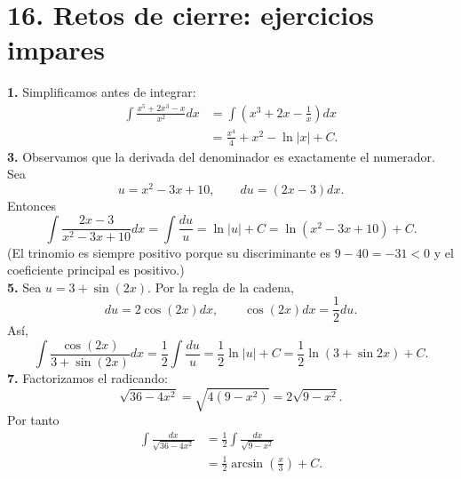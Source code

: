 \documentclass[11pt]{article}
\begin{document}
\section*{16. Retos de cierre: ejercicios impares}
\textbf{1.} Simplificamos antes de integrar:
\begin{align*}\int\frac{x^5+2x^3-x}{x^2}dx&=\int\left(x^3+2x-\frac1x\right)dx\\&=\frac{x^4}{4}+x^2-\ln|x|+C.\end{align*}
\textbf{3.} Observamos que la derivada del denominador es exactamente el numerador. Sea
\[u=x^2-3x+10,\qquad du=(2x-3)dx.\]
Entonces
\[\int\frac{2x-3}{x^2-3x+10}dx=\int\frac{du}{u}=\ln|u|+C=\ln(x^2-3x+10)+C.\]
(El trinomio es siempre positivo porque su discriminante es $9-40=-31<0$ y el coeficiente principal es positivo.)\\
\textbf{5.} Sea $u=3+\sin(2x)$. Por la regla de la cadena,
\[du=2\cos(2x)dx,\qquad \cos(2x)dx=\frac12du.\]
Así,
\[\int\frac{\cos(2x)}{3+\sin(2x)}dx=\frac12\int\frac{du}{u}=\frac12\ln|u|+C=\frac12\ln(3+\sin2x)+C.\]
\textbf{7.} Factorizamos el radicando:
\[\sqrt{36-4x^2}=\sqrt{4(9-x^2)}=2\sqrt{9-x^2}.\]
Por tanto
\begin{align*}\int\frac{dx}{\sqrt{36-4x^2}}&=\frac12\int\frac{dx}{\sqrt{9-x^2}}\\&=\frac12\arcsin\left(\frac{x}{3}\right)+C.\end{align*}
\end{document}
